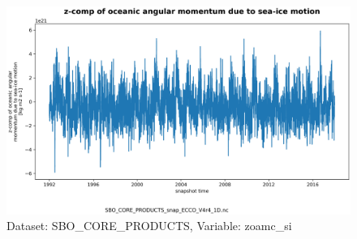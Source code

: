 \begin{figure}[H]
\centering
\includegraphics[scale=0.55]{../images/plots/v4r4/oneD_plots/SBO_Core_Products/zoamc_si.png}
\caption{Dataset: SBO\_CORE\_PRODUCTS, Variable: zoamc\_si}
\label{tab:table-SBO_CORE_PRODUCTS_zoamc_si-Plot}
\end{figure}
\newpage
\pagebreak
